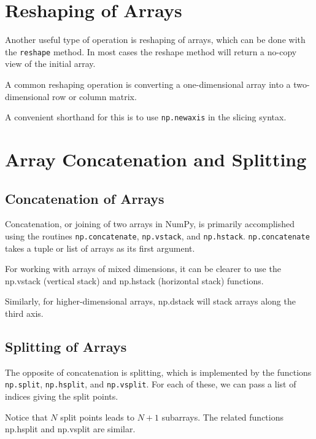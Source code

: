 \section{Reshaping of Arrays}

Another useful type of operation is reshaping of arrays, which can be done with the
\verb|reshape| method. In most cases the reshape method will return a no-copy view of
the initial array.

A common reshaping operation is converting a one-dimensional array into a two-dimensional row or column matrix.

A convenient shorthand for this is to use \verb|np.newaxis| in the slicing syntax.

\section{Array Concatenation and Splitting}
\subsection{Concatenation of Arrays}

Concatenation, or joining of two arrays in NumPy, is primarily accomplished using
the routines \verb|np.concatenate|, \verb|np.vstack|, and \verb|np.hstack|. \verb|np.concatenate| takes a
tuple or list of arrays as its first argument.

For working with arrays of mixed dimensions, it can be clearer to use the np.vstack
(vertical stack) and np.hstack (horizontal stack) functions.


Similarly, for higher-dimensional arrays, np.dstack will stack arrays along the third
axis.

\subsection{Splitting of Arrays}
The opposite of concatenation is splitting, which is implemented by the functions
\verb|np.split|, \verb|np.hsplit|, and \verb|np.vsplit|. For each of these, we can pass a list of indices
giving the split points.

Notice that $N$ split points leads to $N + 1$ subarrays. The related functions np.hsplit
and np.vsplit are similar.
